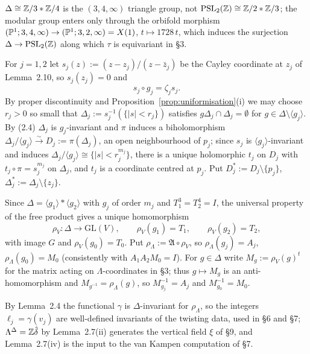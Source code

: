 \begin{remark}\label{rem:triangle-group-not-modular}
$\Delta \cong \mathbb{Z}/3 * \mathbb{Z}/4$ is the $(3,4,\infty)$ triangle group, not $\mathrm{PSL}_2(\mathbb{Z}) \cong \mathbb{Z}/2 * \mathbb{Z}/3$; the modular group enters only through the orbifold morphism $(\mathbb{P}^1; 3,4,\infty) \to (\mathbb{P}^1; 3,2,\infty) = X(1)$, $t \mapsto 1728\,t$, which induces the surjection $\Delta \to \mathrm{PSL}_2(\mathbb{Z})$ along which $\tau$ is equivariant in \S3.
\end{remark}

\begin{definition}\label{def:linearising-coords}
For $j=1,2$ let $s_j(z) := (z-z_j)/(z-\bar z_j)$ be the Cayley coordinate at $z_j$ of Lemma~2.10, so $s_j(z_j) = 0$ and
\begin{equation}
s_j \circ g_j = \zeta_j s_j. \tag{2.4}
\end{equation}
By proper discontinuity and Proposition~\ref{prop:uniformisation}(i) we may choose $r_j>0$ so small that $\Delta_j := s_j^{-1}(\{|s|<r_j\})$ satisfies $g\Delta_j \cap \Delta_j = \emptyset$ for $g \in \Delta \setminus \langle g_j\rangle$. By (2.4) $\Delta_j$ is $g_j$-invariant and $\pi$ induces a biholomorphism $\Delta_j/\langle g_j\rangle \xrightarrow{\sim} D_j := \pi(\Delta_j)$, an open neighbourhood of $p_j$; since $s_j$ is $\langle g_j\rangle$-invariant and induces $\Delta_j/\langle g_j\rangle \cong \{|s|<r_j^{m_j}\}$, there is a unique holomorphic $t_j$ on $D_j$ with $t_j \circ \pi = s_j^{m_j}$ on $\Delta_j$, and $t_j$ is a coordinate centred at $p_j$. Put $D_j^* := D_j \setminus \{p_j\}$, $\Delta_j^* := \Delta_j \setminus \{z_j\}$.
\end{definition}

\begin{definition}\label{def:representation}
Since $\Delta = \langle g_1\rangle * \langle g_2\rangle$ with $g_j$ of order $m_j$ and $T_1^3 = T_2^4 = I$, the universal property of the free product gives a unique homomorphism
\[
\rho_V \colon \Delta \to \mathrm{GL}(V), \qquad \rho_V(g_1) = T_1, \qquad \rho_V(g_2) = T_2,
\]
with image $G$ and $\rho_V(g_0) = T_0$. Put $\rho_\Lambda := \mathfrak A \circ \rho_V$, so $\rho_\Lambda(g_j) = A_j$, $\rho_\Lambda(g_0) = M_0$ (consistently with $A_1A_2M_0 = I$). For $g \in \Delta$ write $M_g := \rho_V(g)^t$ for the matrix acting on $\Lambda$-coordinates in \S3; thus $g \mapsto M_g$ is an anti-homomorphism and $M_{g^{-1}} = \rho_\Lambda(g)$, so $M_{g_j}^{-1} = A_j$ and $M_{g_0}^{-1} = M_0$.

By Lemma~2.4 the functional $\gamma$ is $\Delta$-invariant for $\rho_\Lambda$, so the integers $\ell_j = \gamma(v_j)$ are well-defined invariants of the twisting data, used in \S6 and \S7; $\Lambda^\Delta = \mathbb{Z}\hat\delta$ by Lemma~2.7(ii) generates the vertical field $\xi$ of \S9, and Lemma~2.7(iv) is the input to the van Kampen computation of \S7.
\end{definition}

